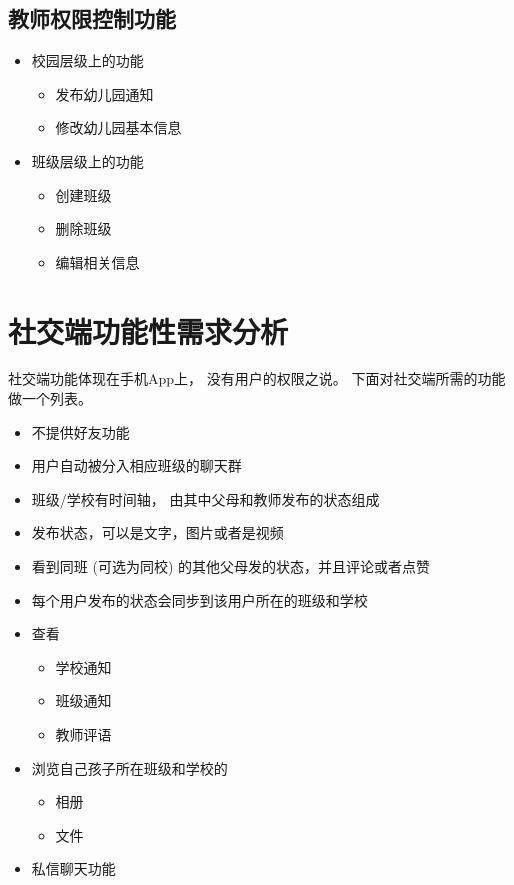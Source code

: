 \subsection{教师权限控制功能}

\begin{itemize}
	\item 校园层级上的功能
	\begin{itemize}
		\item 发布幼儿园通知
		\item 修改幼儿园基本信息 
	\end{itemize}
	   
	
	\item 班级层级上的功能
	
	\begin{itemize}
		\item 	创建班级
		\item  删除班级
		\item  编辑相关信息
	\end{itemize}
\end{itemize}



\section{社交端功能性需求分析}


社交端功能体现在手机App上， 没有用户的权限之说。 下面对社交端所需的功能做一个列表。


\begin{itemize}
	\item 不提供好友功能
	
	\item 用户自动被分入相应班级的聊天群
	
	\item 班级/学校有时间轴， 由其中父母和教师发布的状态组成
	
	\item 发布状态，可以是文字，图片或者是视频
	
	\item 看到同班 (可选为同校) 的其他父母发的状态，并且评论或者点赞
	
	\item 每个用户发布的状态会同步到该用户所在的班级和学校
	
	\item 查看
	\begin{itemize}
		\item 学校通知
		\item 班级通知
		\item 教师评语
	\end{itemize}
	
	
	\item 浏览自己孩子所在班级和学校的
	
	\begin{itemize}
		\item 相册
		\item 文件
	\end{itemize}
		
	\item 私信聊天功能
\end{itemize}


